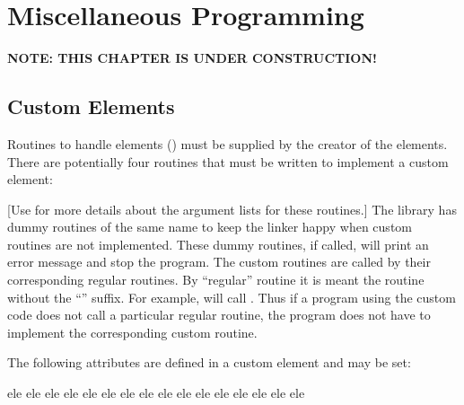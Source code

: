 \chapter{Miscellaneous Programming}

{\bf NOTE: THIS CHAPTER IS UNDER CONSTRUCTION!}

\section{Custom Elements}
\label{s:custom.ele}

Routines to handle  elements () must be supplied
by the creator of the elements.
There are potentially four routines that must be written to implement a custom 
element:
\begin{example}
\end{example}
[Use  for more details about the argument lists for these
routines.]  The \bmad library has dummy routines of the same name to
keep the linker happy when custom routines are not implemented. These
dummy routines, if called, will print an error message and stop the
program. The custom routines are called by their corresponding regular
routines. By ``regular'' routine it is meant the routine without the
``'' suffix. For example,  will
call . Thus if a program using the
custom code does not call a particular regular routine, the program
does not have to implement the corresponding custom routine.

The following attributes are defined in a custom element and may be set:
\begin{example}
    ele%
    ele%
    ele%
    ele%
    ele%
    ele%
    ele%
    ele%
    ele%
    ele%
    ele%
    ele%
    ele%
    ele%
    ele%
    ele%
\end{example}

